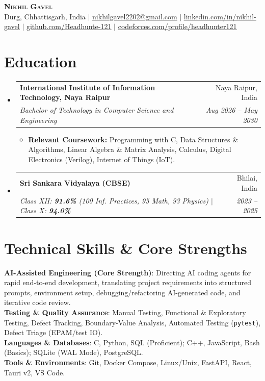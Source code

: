 \documentclass[letterpaper,11pt]{article}
\makeatletter
\newcommand{\resumeItem}[1]{
  \item\small{
    {#1 \vspace{-2pt}}
  }
}
\newcommand{\resumeSubheading}[4]{
  \vspace{-2pt}\item
    \begin{tabular*}{0.97\textwidth}[t]{l@{\extracolsep{\fill}}r}
      \textbf{#1} & #2 \\
      \textit{\small#3} & \textit{\small #4} \\
    \end{tabular*}\vspace{-9pt}
}
\newcommand{\resumeSubHeadingListStart}{\begin{itemize}[leftmargin=0.15in, label={}]}
\newcommand{\resumeSubHeadingListEnd}{\end{itemize}}
\newcommand{\resumeItemListStart}{\begin{itemize}}
\newcommand{\resumeItemListEnd}{\end{itemize}\vspace{-7pt}}
\makeatother
\begin{document}
\begin{center}
    \textbf{\Huge \scshape Nikhil Gavel} \\ \vspace{2pt}
    \small Durg, Chhattisgarh, India $|$ \href{mailto:nikhilgavel2202@gmail.com}{\underline{nikhilgavel2202@gmail.com}} $|$ 
    \href{https://www.linkedin.com/in/nikhil-gavel}{\underline{linkedin.com/in/nikhil-gavel}} $|$
    \href{https://github.com/Headhunte-121}{\underline{github.com/Headhunte-121}} $|$
    \href{https://codeforces.com/profile/headhunter121}{\underline{codeforces.com/profile/headhunter121}}
\end{center}


\section{Education}
  \resumeSubHeadingListStart
    \resumeSubheading
      {International Institute of Information Technology, Naya Raipur}{Naya Raipur, India}
      {Bachelor of Technology in Computer Science and Engineering}{Aug 2026 -- May 2030}
      \resumeItemListStart
        \resumeItem{\textbf{Relevant Coursework:} Programming with C, Data Structures \& Algorithms, Linear Algebra \& Matrix Analysis, Calculus, Digital Electronics (Verilog), Internet of Things (IoT).}
      \resumeItemListEnd
    \resumeSubheading
      {Sri Sankara Vidyalaya (CBSE)}{Bhilai, India}
      {Class XII: \textbf{91.6\%} (100 Inf. Practices, 95 Math, 93 Physics) $|$ Class X: \textbf{94.0\%}}{2023 -- 2025}
  \resumeSubHeadingListEnd


\section{Technical Skills \& Core Strengths}
 \begin{itemize}[leftmargin=0.15in, label={}]
    \small{\item{
     \textbf{AI-Assisted Engineering (Core Strength)}{: Directing AI coding agents for rapid end-to-end development, translating project requirements into structured prompts, environment setup, debugging/refactoring AI-generated code, and iterative code review.} \\
     \textbf{Testing \& Quality Assurance}{: Manual Testing, Functional \& Exploratory Testing, Defect Tracking, Boundary-Value Analysis, Automated Testing (\texttt{pytest}), Defect Triage (EPAM/test IO).} \\
     \textbf{Languages \& Databases}{: C, Python, SQL (Proficient); C++, JavaScript, Bash (Basics); SQLite (WAL Mode), PostgreSQL.} \\
     \textbf{Tools \& Environments}{: Git, Docker Compose, Linux/Unix, FastAPI, React, Tauri v2, VS Code.}
    }}
 \end{itemize}
\end{document}

